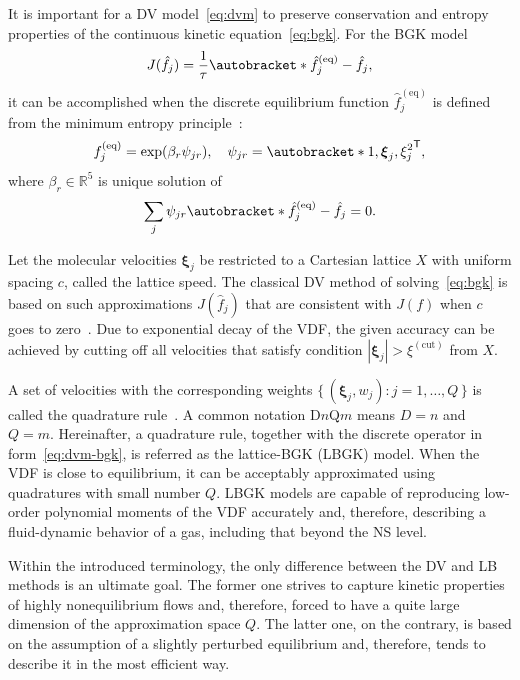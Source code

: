 \documentclass[]{elsarticle} %
\newcommand{\Set}[2]{\{\,{#1}:{#2}\,\}}
\newcommand{\transpose}[1]{#1^\mathsf{T}}
\DeclarePairedDelimiter\autobracket()       %
\newcommand{\br}[1]{\autobracket*{#1}}
\newcommand{\bxi}{\boldsymbol{\xi}}
\newcommand{\bxia}{\bxi_j}
\newcommand{\equil}[1]{#1^\mathrm{(eq)}}
\begin{document}
{%
It is important for a DV model~\eqref{eq:dvm} to preserve conservation and entropy properties
of the continuous kinetic equation~\eqref{eq:bgk}.
For the BGK model
\begin{equation}\label{eq:dvm-bgk}
    J(\hat{f}_j) = \frac1\tau\br{\equil{\hat{f}}_j-\hat{f}_j},
\end{equation}
it can be accomplished when the discrete equilibrium function \(\equil{\hat{f}}_j\)
is defined from the minimum entropy principle~\cite{Mieussens2000}:
\begin{equation}\label{eq:equilibrium-bgk}
   \equil{f}_j = \exp(\beta_r\psi_{j r}), \quad
   \psi_{j r} = \transpose{\br{1,\bxia, \xi_j^2}},
\end{equation}
where \(\beta_r\in\mathbb{R}^5\) is unique solution of
\begin{equation}\label{eq:beta}
   \sum_j\psi_{j r}\br{\equil{\hat{f}}_j - \hat{f}_j} = 0.
\end{equation}

Let the molecular velocities \(\bxi_j \) be restricted to a Cartesian lattice \(X\)
with uniform spacing \(c\), called the lattice speed.
The classical DV method of solving~\eqref{eq:bgk} is based on such approximations \(J(\hat{f}_j)\)
that are consistent with \(J(f)\) when \(c\) goes to zero~\cite{Aristov2001}.
Due to exponential decay of the VDF, the given accuracy can be achieved
by cutting off all velocities that satisfy condition \(|\bxi_j| > \xi^{(\mathrm{cut})}\) from \(X\).

A set of velocities with the corresponding weights \(\Set{(\bxi_j,w_j)}{j=1,\dots,Q}\)
is called the quadrature rule~\cite{Stroud1971}.
A common notation D\(n\)Q\(m\) means \(D=n\) and \(Q=m\).
Hereinafter, a quadrature rule, together with the discrete operator in form~\eqref{eq:dvm-bgk},
is referred as the lattice-BGK (LBGK) model.
When the VDF is close to equilibrium, it can be acceptably approximated using quadratures with small number \(Q\).
LBGK models are capable of reproducing low-order polynomial moments of the VDF accurately and,
therefore, describing a fluid-dynamic behavior of a gas, including that beyond the NS level.

Within the introduced terminology, the only difference between the DV and LB methods is an ultimate goal.
The former one strives to capture kinetic properties of highly nonequilibrium flows and, therefore,
forced to have a quite large dimension of the approximation space \(Q\).
The latter one, on the contrary, is based on the assumption of a slightly perturbed equilibrium and, therefore,
tends to describe it in the most efficient way.

}
\end{document}
